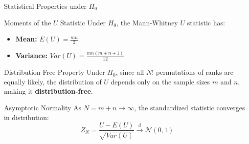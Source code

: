 \documentclass[8pt]{beamer}
\begin{document}
\begin{frame}{Statistical Properties under $H_0$}
    \begin{block}{Moments of the $U$ Statistic}
    Under $H_0$, the Mann-Whitney $U$ statistic has:
    \begin{itemize}
        \item \textbf{Mean:} $E(U) = \frac{mn}{2}$
        \item \textbf{Variance:} $Var(U) = \frac{mn(m+n+1)}{12}$
    \end{itemize}
    \end{block}

    \begin{block}{Distribution-Free Property}
    Under $H_0$, since all $N!$ permutations of ranks are equally likely, the distribution of $U$ depends only on the sample sizes $m$ and $n$, making it \textbf{distribution-free}.
    \end{block}

    \begin{block}{Asymptotic Normality}
    As $N = m + n \to \infty$, the standardized statistic converges in distribution:
    $$Z_N = \frac{U - E(U)}{\sqrt{Var(U)}} \xrightarrow{d} \mathcal{N}(0, 1)$$
    \end{block}
\end{frame}
\end{document}
